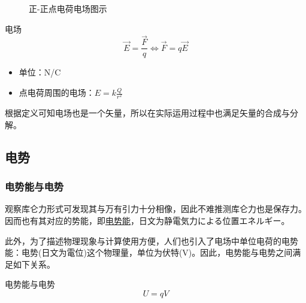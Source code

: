 \begin{figure}[p!]
    \centering
    \caption{正-正点电荷电场图示}
\end{figure}

\begin{itembox}[l]{电场}
    \begin{equation*}
        \vec{E}=\frac{\vec{F}}{q}
        \iff
        \vec{F}=q\vec{E}
    \end{equation*}
    \begin{itemize}
        \item 单位：N/C
        \item 点电荷周围的电场：$E=k\frac{Q}{r^2}$
    \end{itemize}
\end{itembox}
根据定义可知电场也是一个矢量，所以在实际运用过程中也满足矢量的合成与分解。

\subsection{电势}
\label{subsec:电势}

\subsubsection{电势能与电势}

观察库仑力形式可发现其与万有引力十分相像，因此不难推测库仑力也是保存力。因而也有其对应的势能，即\underline{电势能}，日文为静電気力による位置エネルギー。

此外，为了描述物理现象与计算使用方便，人们也引入了电场中单位电荷的电势能：电势(日文为電位)这个物理量，单位为伏特(V)。因此，电势能与电势之间满足如下关系。
\begin{itembox}[l]{电势能与电势}
    \begin{equation*}
        U=qV
    \end{equation*}
\end{itembox}

